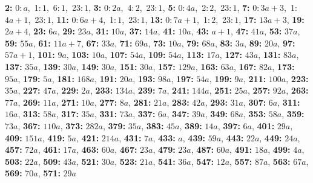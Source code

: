 \textsf{\bfseries 2:} 0:\,$a$,\ 1:\,$1$,\ 6:\,$1$,\ 23:\,$1$, \textsf{\bfseries 3:} 0:\,$2a$,\ 4:\,$2$,\ 23:\,$1$, \textsf{\bfseries 5:} 0:\,$4a$,\ 2:\,$2$,\ 23:\,$1$, \textsf{\bfseries 7:} 0:\,$3a + 3$,\ 1:\,$4a + 1$,\ 23:\,$1$, \textsf{\bfseries 11:} 0:\,$6a + 4$,\ 1:\,$1$,\ 23:\,$1$, \textsf{\bfseries 13:} 0:\,$7a + 1$,\ 1:\,$2$,\ 23:\,$1$, \textsf{\bfseries 17:} $13a + 3$, \textsf{\bfseries 19:} $2a + 4$, \textsf{\bfseries 23:} $6a$, \textsf{\bfseries 29:} $23a$, \textsf{\bfseries 31:} $10a$, \textsf{\bfseries 37:} $14a$, \textsf{\bfseries 41:} $10a$, \textsf{\bfseries 43:} $a + 1$, \textsf{\bfseries 47:} $41a$, \textsf{\bfseries 53:} $37a$, \textsf{\bfseries 59:} $55a$, \textsf{\bfseries 61:} $11a + 7$, \textsf{\bfseries 67:} $33a$, \textsf{\bfseries 71:} $69a$, \textsf{\bfseries 73:} $10a$, \textsf{\bfseries 79:} $68a$, \textsf{\bfseries 83:} $3a$, \textsf{\bfseries 89:} $20a$, \textsf{\bfseries 97:} $57a + 1$, \textsf{\bfseries 101:} $9a$, \textsf{\bfseries 103:} $10a$, \textsf{\bfseries 107:} $54a$, \textsf{\bfseries 109:} $54a$, \textsf{\bfseries 113:} $17a$, \textsf{\bfseries 127:} $43a$, \textsf{\bfseries 131:} $83a$, \textsf{\bfseries 137:} $35a$, \textsf{\bfseries 139:} $30a$, \textsf{\bfseries 149:} $30a$, \textsf{\bfseries 151:} $30a$, \textsf{\bfseries 157:} $129a$, \textsf{\bfseries 163:} $63a$, \textsf{\bfseries 167:} $82a$, \textsf{\bfseries 173:} $95a$, \textsf{\bfseries 179:} $5a$, \textsf{\bfseries 181:} $168a$, \textsf{\bfseries 191:} $20a$, \textsf{\bfseries 193:} $98a$, \textsf{\bfseries 197:} $54a$, \textsf{\bfseries 199:} $9a$, \textsf{\bfseries 211:} $100a$, \textsf{\bfseries 223:} $35a$, \textsf{\bfseries 227:} $47a$, \textsf{\bfseries 229:} $2a$, \textsf{\bfseries 233:} $134a$, \textsf{\bfseries 239:} $7a$, \textsf{\bfseries 241:} $144a$, \textsf{\bfseries 251:} $25a$, \textsf{\bfseries 257:} $92a$, \textsf{\bfseries 263:} $77a$, \textsf{\bfseries 269:} $11a$, \textsf{\bfseries 271:} $10a$, \textsf{\bfseries 277:} $8a$, \textsf{\bfseries 281:} $21a$, \textsf{\bfseries 283:} $42a$, \textsf{\bfseries 293:} $31a$, \textsf{\bfseries 307:} $6a$, \textsf{\bfseries 311:} $16a$, \textsf{\bfseries 313:} $58a$, \textsf{\bfseries 317:} $35a$, \textsf{\bfseries 331:} $73a$, \textsf{\bfseries 337:} $6a$, \textsf{\bfseries 347:} $39a$, \textsf{\bfseries 349:} $68a$, \textsf{\bfseries 353:} $58a$, \textsf{\bfseries 359:} $73a$, \textsf{\bfseries 367:} $110a$, \textsf{\bfseries 373:} $282a$, \textsf{\bfseries 379:} $35a$, \textsf{\bfseries 383:} $45a$, \textsf{\bfseries 389:} $14a$, \textsf{\bfseries 397:} $6a$, \textsf{\bfseries 401:} $29a$, \textsf{\bfseries 409:} $151a$, \textsf{\bfseries 419:} $5a$, \textsf{\bfseries 421:} $214a$, \textsf{\bfseries 431:} $7a$, \textsf{\bfseries 433:} $a$, \textsf{\bfseries 439:} $59a$, \textsf{\bfseries 443:} $22a$, \textsf{\bfseries 449:} $24a$, \textsf{\bfseries 457:} $72a$, \textsf{\bfseries 461:} $17a$, \textsf{\bfseries 463:} $60a$, \textsf{\bfseries 467:} $23a$, \textsf{\bfseries 479:} $23a$, \textsf{\bfseries 487:} $60a$, \textsf{\bfseries 491:} $18a$, \textsf{\bfseries 499:} $4a$, \textsf{\bfseries 503:} $22a$, \textsf{\bfseries 509:} $43a$, \textsf{\bfseries 521:} $30a$, \textsf{\bfseries 523:} $21a$, \textsf{\bfseries 541:} $36a$, \textsf{\bfseries 547:} $12a$, 
\textsf{\bfseries 557:} $87a$, \textsf{\bfseries 563:} $67a$, \textsf{\bfseries 569:} $70a$, \textsf{\bfseries 571:} $29a$